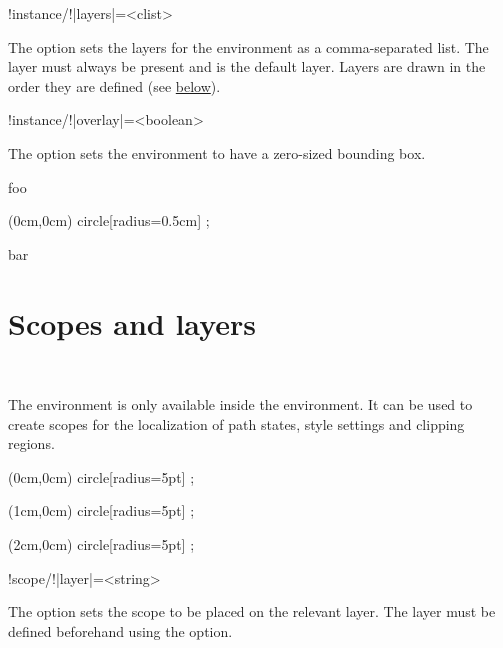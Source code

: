 \documentclass[a4paper]{article}
\begin{document}
\begin{macrodef}
!instance/!|layers|={<clist>}
\end{macrodef}
The option  sets the layers for the environment as a comma-separated list. The layer  must always be present and is the default layer. Layers are drawn in the order they are defined (see \hyperlink{sec:scopes}{below}).

\begin{macrodef}
!instance/!|overlay|={<boolean>}
\end{macrodef}
The option  sets the environment to have a zero-sized bounding box.

\begin{codeexamplecolumns}
foo
\begin{qdraw}[overlay, baseline={0.5ex}]
  \stroke[stroke color={blue}]
    (0cm,0cm) circle[radius={0.5cm}] ;
\end{qdraw}
bar
\end{codeexamplecolumns}

\section{Scopes and layers}\label{sec:scopes}

\begin{macrodef}
\\\begin{|scope|}[<options>]
\end{|scope|}
\end{macrodef}
The  environment is only available inside the  environment. It can be used to create scopes for the localization of path states, style settings and clipping regions. 

\begin{codeexamplecolumns}
\begin{qdraw}[fill color={blue}]
  \fill (0cm,0cm) circle[radius={5pt}] ;
  \begin{scope}[fill color={black}]
    \fill (1cm,0cm) circle[radius={5pt}] ;
  \end{scope}
  \fill (2cm,0cm) circle[radius={5pt}] ;
\end{qdraw}
\end{codeexamplecolumns}

\begin{macrodef}
!scope/!|layer|={<string>}
\end{macrodef}
The option  sets the scope to be placed on the relevant layer. The layer must be defined beforehand using the  option.
\end{document}
